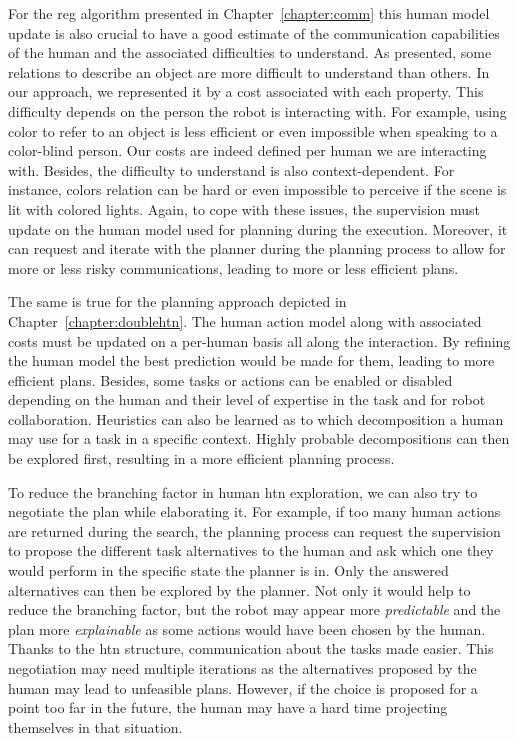 \documentclass[a4paper,11pt,twoside]{StyleThese}
\begin{document}
For the \acrshort{reg} algorithm presented in Chapter~\ref{chapter:comm} this human model update is also crucial to have a good estimate of the communication capabilities of the human and the associated difficulties to understand. As presented, some relations to describe an object are more difficult to understand than others. In our approach, we represented it by a cost associated with each property. This difficulty depends on the person the robot is interacting with. For example, using color to refer to an object is less efficient or even impossible when speaking to a color-blind person. Our costs are indeed defined per human we are interacting with. Besides, the difficulty to understand is also context-dependent. For instance, colors relation can be hard or even impossible to perceive if the scene is lit with colored lights. Again, to cope with these issues, the supervision must update on the human model used for planning during the execution. Moreover, it can request and iterate with the planner during the planning process to allow for more or less risky communications, leading to more or less efficient plans.

The same is true for the planning approach depicted in Chapter~\ref{chapter:doublehtn}. The human action model along with associated costs must be updated on a per-human basis all along the interaction. By refining the human model the best prediction would be made for them, leading to more efficient plans. Besides, some tasks or actions can be enabled or disabled depending on the human and their level of expertise in the task and for robot collaboration. Heuristics can also be learned as to which decomposition a human may use for a task in a specific context. Highly probable decompositions can then be explored first, resulting in a more efficient planning process.

To reduce the branching factor in human \acrshort{htn} exploration, we can also try to negotiate the plan while elaborating it. For example, if too many human actions are returned during the search, the planning process can request the supervision to propose the different task alternatives to the human and ask which one they would perform in the specific state the planner is in. Only the answered alternatives can then be explored by the planner. Not only it would help to reduce the branching factor, but the robot may appear more \textit{predictable} and the plan more \textit{explainable} as some actions would have been chosen by the human. Thanks to the \acrshort{htn} structure, communication about the tasks made easier. This negotiation may need multiple iterations as the alternatives proposed by the human may lead to unfeasible plans. However, if the choice is proposed for a point too far in the future, the human may have a hard time projecting themselves in that situation.
\end{document}
